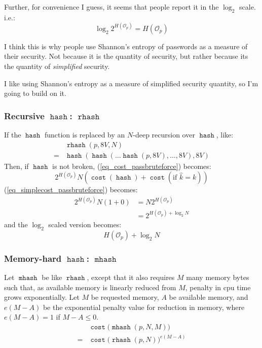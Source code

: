 \documentclass[twocolumn]{article}
\DeclareMathOperator{\hash}{\mathtt{hash}}
\DeclareMathOperator{\rhash}{\mathtt{rhash}}
\DeclareMathOperator{\mhash}{\mathtt{mhash}}
\DeclareMathOperator{\cost}{\mathtt{cost}}
\begin{document}
Further, for convenience I guess, it seems that people report it in the
$\log_2$ scale.  i.e.:
\begin{equation}\label{eq_pass_entropy}
    \log_2 2^{H(\mathcal{O}_p)} = H(\mathcal{O}_p)
\end{equation}

I think this is why people use Shannon's entropy of passwords as a measure
of their security.  Not because it is the quantity of security, but rather
because its the quantity of \emph{simplified} security.

I like using Shannon's entropy as a measure of simplified security
quantity, so I'm going to build on it.

\subsubsection{Recursive $\hash$: $\rhash$}
If the $\hash$ function is replaced by an $N$-deep recursion over $\hash$,
like:
\[
    \begin{split}
        & \rhash(p, 8V, N) \\
    ={} &  \hash(\hash(\ldots\hash(p, 8V), \ldots, 8V), 8V)
    \end{split}
\]
Then, if $\hash$ is not broken,  (\ref{eq_cost_passbruteforce}) becomes:
\begin{equation}\label{eq_cost_passbruteforce_N}
    2^{H(\mathcal{O}_p)} N \left(
        \cost(\hash) + \cost(\text{if } \hat k = k)
    \right)
\end{equation}
(\ref{eq_simplecost_passbruteforce}) becomes:
\begin{equation}\label{eq_simplecost_passbruteforce_N}
    \begin{split}
    2^{H(\mathcal{O}_p)} N (1+0) &= N2^{H(\mathcal{O}_p)} \\
                  &= 2^{H(\mathcal{O}_p) + \log_2 N}
    \end{split}
\end{equation}
and the $\log_2$ scaled version becomes:
\begin{equation}\label{eq_pass_cavemanentropy_rhash}
    H(\mathcal{O}_p) + \log_2 N
\end{equation}

\subsubsection{Memory-hard $\hash$: $\mhash$}
Let $\mhash$ be like $\rhash$, except that it also requires $M$ many memory
bytes such that, as available memory is linearly reduced from $M$, penalty
in cpu time grows exponentially.  Let $M$ be requested memory, $A$ be
available memory, and $e(M - A)$ be the exponential penalty value for
reduction in memory, where $e(M - A) = 1$ if $M-A \le 0$.
\begin{equation}
    \begin{split}
        & \cost\Big(\mhash(p, N, M)\Big) \\
    ={} & \cost\Big(\rhash(p, N)\Big)^{e(M-A)}
    \end{split}
\end{equation}
\end{document}
